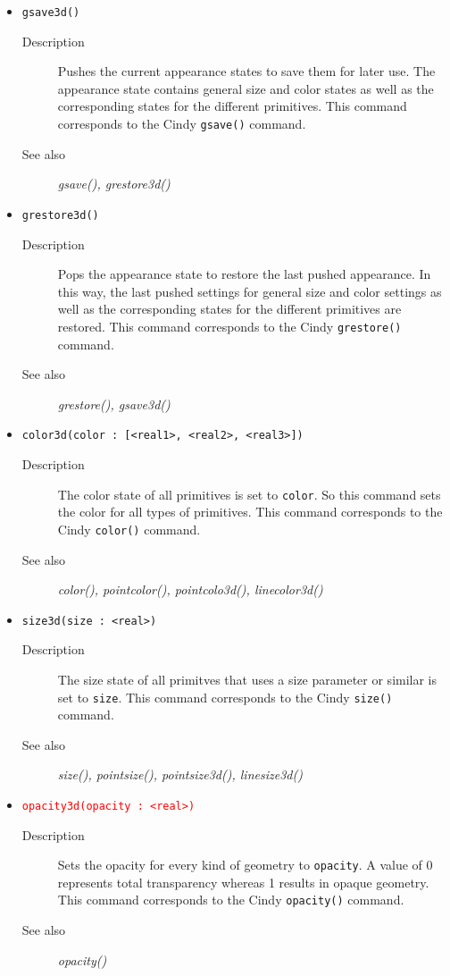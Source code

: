 \documentclass[10pt,a4widepaper]{scrartcl}
\newcommand{\cBlue}[1]{\textcolor{CBlue}{\texttt{#1}}}
\newcommand{\cRed}[1]{\textcolor{red}{\texttt{#1}}}
\newcommand{\desc}{\item[Description]}
\newcommand{\salso}{\item[See also]}
\begin{document}
\begin{itemize}

\item \cBlue{gsave3d()}
\begin{description}
\desc Pushes the current appearance states to save them for later use. The appearance state contains general size and color states as well as the corresponding states for the different primitives. This command corresponds to the Cindy \texttt{gsave()} command.
\salso \textit{gsave(), grestore3d()}
\end{description}

\item \cBlue{grestore3d()}
\begin{description}
\desc Pops the appearance state to restore the last pushed appearance. In this way, the last pushed settings for general size and color settings as well as the corresponding states for the different primitives are restored. This command corresponds to the Cindy \texttt{grestore()} command.
\salso \textit{grestore(), gsave3d()}
\end{description}

\item \cBlue{color3d(color : [<real1>, <real2>, <real3>])}
\begin{description}
\desc The color state of all primitives is set to \texttt{color}. So this command sets the color for all types of primitives. This command corresponds to the Cindy \texttt{color()} command.
\salso \textit{color(), pointcolor(), pointcolo3d(), linecolor3d()}
\end{description}

\item \cBlue{size3d(size : <real>)}
\begin{description}
\desc The size state of all primitves that uses a size parameter or similar is set to \texttt{size}. This command corresponds to the Cindy \texttt{size()} command.
\salso \textit{size(), pointsize(), pointsize3d(), linesize3d()}
\end{description}

\item \cRed{opacity3d(opacity : <real>)}
\begin{description}
\desc Sets the opacity for every kind of geometry to \texttt{opacity}. A value of 0 represents total transparency whereas 1 results in opaque geometry. This command corresponds to the Cindy \texttt{opacity()} command.
\salso \textit{opacity()}
\end{description}


\end{itemize}
\end{document}
